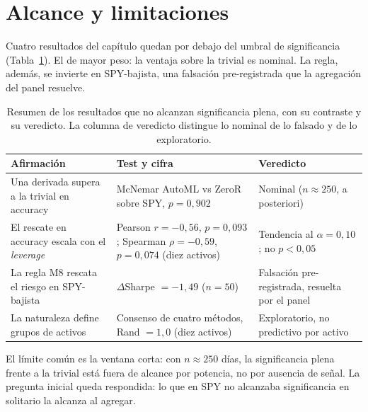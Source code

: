 \section{Alcance y limitaciones}
\label{sec:panel-limites}
\label{sec:panel-lim-tests}

Cuatro resultados del capítulo quedan por debajo del umbral de significancia (Tabla~\ref{tab:mp-limites}). El de mayor peso: la ventaja sobre la trivial es nominal. La regla, además, se invierte en SPY-bajista, una falsación pre-registrada que la agregación del panel resuelve.

\begin{table}[htbp]
\centering
\caption{Resumen de los resultados que no alcanzan significancia plena, con su contraste y su veredicto. La columna de veredicto distingue lo nominal de lo falsado y de lo exploratorio.}
\label{tab:mp-limites}
\begin{tabular}{p{4.4cm}p{4.6cm}p{4.0cm}}
\toprule
Afirmación & Test y cifra & Veredicto \\
\midrule
Una derivada supera a la trivial en accuracy & McNemar AutoML vs ZeroR sobre SPY, $p = 0{,}902$ & Nominal ($n \approx 250$, a posteriori) \\
\addlinespace
El rescate en accuracy escala con el \emph{leverage} & Pearson $r = -0{,}56$, $p = 0{,}093$; Spearman $\rho = -0{,}59$, $p = 0{,}074$ (diez activos) & Tendencia al $\alpha = 0{,}10$; no $p < 0{,}05$ \\
\addlinespace
La regla M8 rescata el riesgo en SPY-bajista & $\Delta$Sharpe $= -1{,}49$ ($n = 50$) & Falsación pre-registrada, resuelta por el panel \\
\addlinespace
La naturaleza define grupos de activos & Consenso de cuatro métodos, Rand $= 1{,}0$ (diez activos) & Exploratorio, no predictivo por activo \\
\bottomrule
\end{tabular}
\end{table}

El límite común es la ventana corta: con $n \approx 250$ días, la significancia plena frente a la trivial está fuera de alcance por potencia, no por ausencia de señal. La pregunta inicial queda respondida: lo que en SPY no alcanzaba significancia en solitario la alcanza al agregar.
